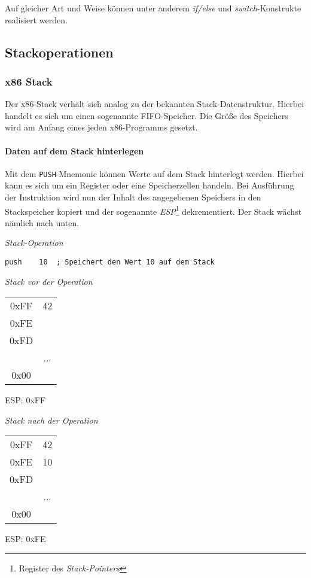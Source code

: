 Auf gleicher Art und Weise können unter anderem \textit{if/else} und \textit{switch}-Konstrukte realisiert werden.


\subsection{Stackoperationen}
\subsubsection{x86 Stack}
Der x86-Stack verhält sich analog zu der bekannten Stack-Datenstruktur. Hierbei handelt es sich um einen sogenannte FIFO-Speicher.
Die Größe des Speichers wird am Anfang eines jeden x86-Programms gesetzt.

\paragraph{Daten auf dem Stack hinterlegen\newline} 
Mit dem \texttt{PUSH}-Mnemonic können Werte auf dem Stack hinterlegt werden.
Hierbei kann es sich um ein Register oder eine Speicherzellen handeln.
Bei Ausführung der Instruktion wird nun der Inhalt des angegebenen Speichers in den Stackspeicher kopiert
und der sogenannte \textit{ESP}\footnote{Register des \textit{Stack-Pointers}} dekrementiert.
Der Stack wächst nämlich nach unten.


\textit{Stack-Operation}
\begin{lstlisting}
push    10  ; Speichert den Wert 10 auf dem Stack
\end{lstlisting}

\begin{multicols}{2}
\begin{minipage}{5cm}
\emph{Stack vor der Operation}\\
\begin{tabular}{c|c|}
	\cline{2-2}
   0xFF & 42\\ \cline{2-2}
   0xFE & \\ \cline{2-2}
   0xFD & \\ \cline{2-2}
	      & ... \\ \cline{2-2}
	 0x00 & \\ \cline{2-2}
\end{tabular}
ESP: 0xFF
\end{minipage}

\begin{minipage}{5cm}
\emph{Stack nach der Operation}\\
\begin{tabular}{c|c|}
	\cline{2-2}
   0xFF & 42\\ \cline{2-2}
   0xFE & 10\\ \cline{2-2}
   0xFD & \\ \cline{2-2}
	      & ... \\ \cline{2-2}
	 0x00 & \\ \cline{2-2}
\end{tabular}
ESP: 0xFE
\end{minipage}
\end{multicols}


